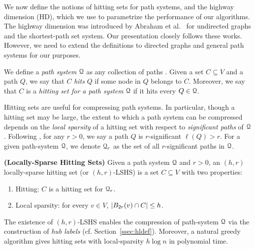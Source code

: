 
We now define the notions of hitting sets for path systems, and the highway dimension (HD), which we use to parametrize the performance of our algorithms. The highway dimension was introduced by Abraham et al.~\cite{highway2010,highway2013} for undirected graphs and the shortest-path set system. 
Our presentation closely follows these works.
However, we need to extend the definitions to directed graphs and general path systems for our purposes. 

We define a \emph{path system} $\calQ$ as any  collection of paths
.
Given a set $C\subseteq V$ and a path $Q$, we say that $C$ \emph{hits} $Q$ if some node in $Q$ belongs to $C$. Moreover, we say that $C$ is a \emph{hitting set for a path system} $\calQ$ if it hits every $Q\in\calQ$.

Hitting sets are useful for compressing path systems. In particular, though a hitting set may be large, the extent to which a path system can be compressed depends on the \emph{local sparsity} of a hitting set with respect to \emph{significant paths} of $\calQ$. 
Following \cite{highway2013}, for any $r>0$, we say a path $Q$ is $r$-significant $\ell(Q)>r$. For a given path-system $\calQ$, we denote $\calQ_r$ as the set of all $r$-significant paths in $\calQ$.
\begin{definition}
\label{def:lshs}
\textbf{(Locally-Sparse Hitting Sets)} Given a path system $\calQ$ and $r>0$, an $(h,r)$ locally-sparse hitting set (or $(h,r)$-LSHS) is a set $C\subseteq V$ with two properties: 
\begin{enumerate}[nosep]
\item Hitting: $C$ is a hitting set for $\calQ_r$.
\item Local sparsity: for every $v\in V$, $\abs*{B_{2r}(v)\cap C}\leq h$.
\end{enumerate}
\end{definition}


The existence of $(h,r)$-LSHS enables the compression of path-system $\calQ$ via the construction of \emph{hub labels} (cf. Section~\ref{ssec:hldef}). Moreover, a natural greedy algorithm gives hitting sets with local-sparsity $h\log n$ in polynomial time. 


